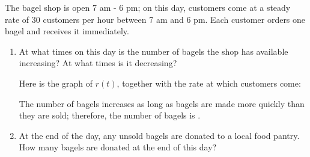 \documentclass[main]{subfiles}
\begin{document}
\begin{enumerate}[resume]
  The bagel shop is open 7 am - 6 pm; on this day, customers come at a
  steady rate of 30 customers per hour between 7 am and 6 pm.  Each
  customer orders one bagel and receives it immediately.

  \begin{enumerate}
  \item
    \begin{problem}[\stretch{0.5}]
      At what times on this day is the number of bagels the shop has
      available increasing?  At what times is it decreasing?  
    \end{problem}

    \begin{solution}
      Here is the graph of $r(t)$, together with the rate at which
      customers come:
      \begin{center}
      \end{center}
      The number of bagels increases as long as bagels are made more
      quickly than they are sold; therefore, the number of bagels is
      . 
    \end{solution}

  \item
    \begin{problem}[\nstretch{1.5}]
      At the end of the day, any unsold bagels are donated to a local food
      pantry.  How many bagels are donated at the end of this day? 
    \end{problem}


\end{enumerate}
\end{enumerate}
\end{document}
